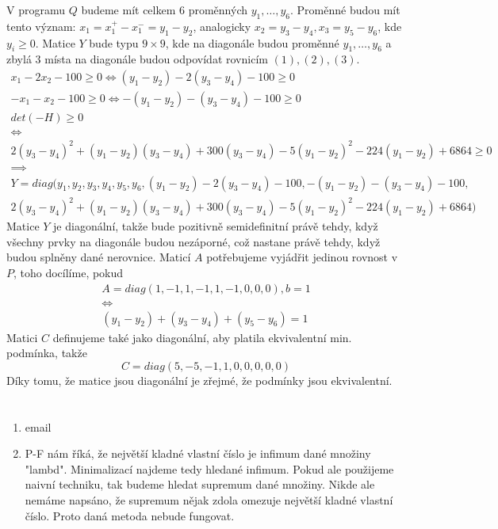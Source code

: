 \documentclass[12pt, a4paper]{article}
\begin{document}
V programu $Q$ budeme mít celkem 6 proměnných $y_1, \dots, y_6$. Proměnné budou mít tento význam: $x_1 = x_1^+ - x_1^- = y_1 - y_2$, analogicky $x_2 = y_3 - y_4, x_3 = y_5 - y_6$, kde $y_i \geq 0$. Matice $Y$ bude typu $9 \times 9$, kde na diagonále budou proměnné $y_1,\dots, y_6$ a zbylá 3 místa na diagonále budou odpovídat rovnicím $(1),(2),(3)$.
\begin{gather*}
x_1-2x_2-100 \geq 0 \iff (y_1-y_2) - 2(y_3-y_4)-100 \geq 0\\
-x_1-x_2-100 \geq 0 \iff -(y_1-y_2) -(y_3-y_4)-100 \geq 0\\
det(-H) \geq 0\\
\iff \\
2(y_3-y_4)^2 + (y_1-y_2)(y_3-y_4) + 300(y_3-y_4) -5(y_1-y_2)^2 - 224(y_1-y_2)+6864 \geq 0\\
\implies \\
Y = diag(y_1, y_2, y_3, y_4, y_5, y_6, (y_1-y_2) - 2(y_3-y_4)-100,  -(y_1-y_2) -(y_3-y_4)-100, \\
2(y_3-y_4)^2 + (y_1-y_2)(y_3-y_4) + 300(y_3-y_4) -5(y_1-y_2)^2 - 224(y_1-y_2)+6864)
\end{gather*}
Matice $Y$ je diagonální, takže bude pozitivně semidefinitní právě tehdy, když všechny prvky na diagonále budou nezáporné, což nastane právě tehdy, když budou splněny dané nerovnice.
Maticí $A$ potřebujeme vyjádřit jedinou rovnost v $P$, toho docílíme, pokud
\begin{gather*}
A = diag(1,-1,1,-1,1,-1,0,0,0), b=1\\
\iff\\
(y_1-y_2)+(y_3-y_4)+(y_5-y_6) = 1
\end{gather*}
Matici $C$ definujeme také jako diagonální, aby platila ekvivalentní min. podmínka, takže
\[
C = diag(5,-5,-1,1,0,0,0,0,0)
\]
Díky tomu, že matice jsou diagonální je zřejmé, že podmínky jsou ekvivalentní.

\section{}
\begin{enumerate}[label=\alph*)]
\item email
\item P-F nám říká, že největší kladné vlastní číslo je infimum dané množiny "lambd". Minimalizací najdeme tedy hledané infimum. Pokud ale použijeme naivní techniku, tak budeme hledat supremum dané množiny. Nikde ale nemáme napsáno, že supremum nějak zdola omezuje největší kladné vlastní číslo. Proto daná metoda nebude fungovat.
\end{enumerate}
\end{document}
